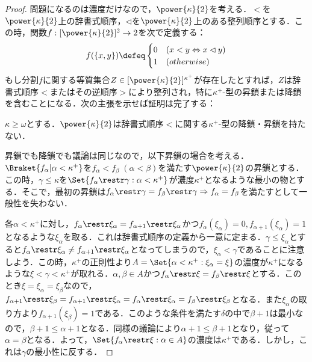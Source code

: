 \documentclass[a4j,lualatex,ja=standard]{bxjsarticle}
\begin{document}
\begin{proof}
 問題になるのは濃度だけなので，$\power{\kappa}{2}$を考える．$<$を$\power{\kappa}{2}$上の辞書式順序，$\lhd$を$\power{\kappa}{2}$上のある整列順序とする．この時，関数$f : [\power{\kappa}{2}]^2 \rightarrow 2$を次で定義する：
 \[
  f(\{x, y\}) \defeq \begin{cases}
		      0 & (x < y \Leftrightarrow x \lhd y)\\
		      1 & (otherwise)
		     \end{cases}
 \]
 もし分割$f$に関する等質集合$Z \in [\power{\kappa}{2}]^{\kappa^+}$が存在したとすれば，$Z$は辞書式順序$<$またはその逆順序$>$により整列され，特に$\kappa^+$-型の昇鎖または降鎖を含むことになる．次の主張を示せば証明は完了する：

\begin{claim}
 $\kappa \geq \omega$とする．$\power{\kappa}{2}$は辞書式順序$<$に関する$\kappa^+$-型の降鎖・昇鎖を持たない．
\end{claim}
昇鎖でも降鎖でも議論は同じなので，以下昇鎖の場合を考える．$\Braket{f_\alpha | \alpha < \kappa^+}$を$f_\alpha < f_\beta \; (\alpha < \beta)$を満たす$\power{\kappa}{2}$の昇鎖とする．この時，$\gamma \leq \kappa$を$\Set{ f_\alpha \restr \gamma : \alpha < \kappa^+}$が濃度$\kappa^+$となるような最小の物とする．そこで，最初の昇鎖は$f_\alpha \restr \gamma = f_\beta \restr \gamma \Rightarrow f_\alpha = f_\beta$を満たすとして一般性を失わない．

各$\alpha < \kappa^+$に対し，$f_\alpha \restr \xi_\alpha = f_{\alpha+1} \restr \xi_\alpha$かつ$f_\alpha(\xi_\alpha) = 0, f_{\alpha+1}(\xi_\alpha) = 1$となるような$\xi_\alpha$を取る．これは辞書式順序の定義から一意に定まる．$\gamma \leq \xi_\alpha$とすると$f_\alpha \restr \xi_\alpha \neq f_{\alpha+1} \restr \xi_\alpha$となってしまうので，$\xi_\alpha < \gamma$であることに注意しよう．この時，$\kappa^+$の正則性より$A = \Set{\alpha < \kappa^+ : \xi_\alpha = \xi}$の濃度が$\kappa^+$になるような$\xi < \gamma < \kappa^+$が取れる．$\alpha, \beta \in A$かつ$f_\alpha \restr \xi = f_\beta \restr \xi$とする．このとき$\xi = \xi_\alpha = \xi_\beta$なので，$f_{\alpha+1} \restr \xi_\beta = f_{\alpha+1} \restr \xi_\alpha = f_\alpha \restr \xi_\alpha = f_\beta \restr \xi_\beta$となる．また$\xi_\alpha$の取り方より$f_{\alpha+1}(\xi_{\beta}) = 1$である．このような条件を満たす$\delta$の中で$\beta+1$は最小なので，$\beta+1 \leq \alpha+1$となる．同様の議論により$\alpha+1\leq\beta+1$となり，従って$\alpha=\beta$となる．よって，$\Set{f_\alpha \restr \xi : \alpha \in A}$の濃度は$\kappa^+$である．しかし，これは$\gamma$の最小性に反する．\mbox{}
\end{proof}
\end{document}
